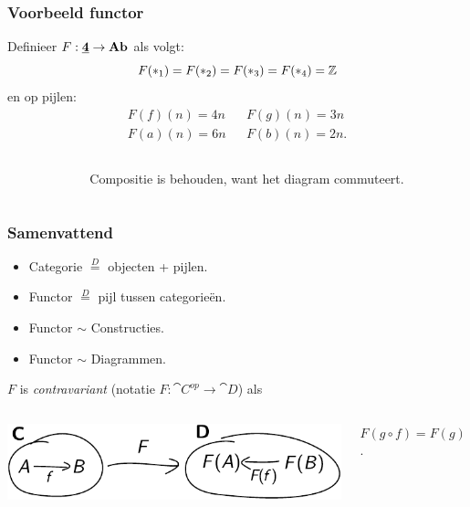 \documentclass[14pt]{beamer}
\begin{document}
\begin{frame}
	\frametitle{Voorbeeld functor}

	Definieer $F: \mathbf{\underline{4}} \to \mathbf{Ab}$ als volgt:
	$$ F(\ast_1) = F(\ast_2) = F(\ast_3) = F(\ast_4) = \mathbb{Z} $$
	en op pijlen:
	\begin{align*}
		F(f)(n) = 4n & & F(g)(n) = 3n \\
		F(a)(n) = 6n & & F(b)(n) = 2n.
	\end{align*}

	\begin{columns}
		\begin{column}{0.5\textwidth}
		\end{column}
		\begin{column}{0.5\textwidth}
		Compositie is behouden, want het diagram commuteert.
		\end{column}
	\end{columns}
\end{frame}

\begin{frame}
	\frametitle{Samenvattend}
	\begin{itemize}
		\item Categorie $\stackrel{D}{=}$ objecten + pijlen.
		\item Functor $\stackrel{D}{=}$ pijl tussen categorie\"en.
	\end{itemize}

	\begin{itemize}
		\item Functor $\sim$ Constructies.
		\item Functor $\sim$ Diagrammen.
	\end{itemize}

	\bigskip\pause
	$F$ is \emph{contravariant} (notatie $F: \cat{C}^{op} \to \cat{D}$) als
	\begin{columns}
		\begin{column}{0.7\textwidth}\includegraphics[scale=0.8]{cat_contrafunctor}\end{column}
		\begin{column}{0.3\textwidth}\small $F(g \circ f) = F(g) \circ F(f)$.\end{column}
	\end{columns}
\end{frame}
\end{document}
